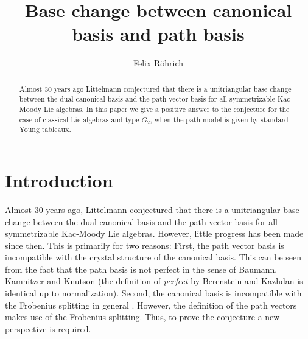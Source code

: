 \documentclass[final]{amsart}
\title{Base change between canonical basis and path basis}
\author{Felix Röhrich}
\theoremstyle{plain}
\theoremstyle{definition}
\begin{document}
\begin{abstract}
    Almost 30 years ago Littelmann conjectured that there is a unitriangular base change between the dual canonical basis and the path vector basis for all symmetrizable Kac-Moody Lie algebras.
    In this paper we give a positive answer to the conjecture for the case of classical Lie algebras and type $G_2$, when the path model is given by standard Young tableaux.
\end{abstract}

\maketitle

\section{Introduction}

Almost 30 years ago, Littelmann \cite{Littelmann:ContractingModules-StandardMonomialTheory} conjectured that there is a unitriangular base change between the dual canonical basis and the path vector basis for all symmetrizable Kac-Moody Lie algebras.
However, little progress has been made since then.
This is primarily for two reasons:
First, the path vector basis is incompatible with the crystal structure of the canonical basis.
This can be seen from the fact that the path basis is not perfect in the sense of Baumann, Kamnitzer and Knutson \cite{BaumannKamnitzerKnutson:MirkovicVilonenBasis-DuistermaatHeckmanMeasures} (the definition of \emph{perfect} by Berenstein and Kazhdan \cite{BerensteinKazhdan:Geometric-UnipotentCrystals-II} is identical up to normalization).
Second, the canonical basis is incompatible with the Frobenius splitting in general \cite{Baumann:CanonicalBasis-QuantumFrobeniusMorphism,Roehrich:DualImaginaryVectors-TightMonomialCones-QuantumFrobeniusMorphism}.
However, the definition of the path vectors makes use of the Frobenius splitting.
Thus, to prove the conjecture a new perspective is required.
\end{document}
